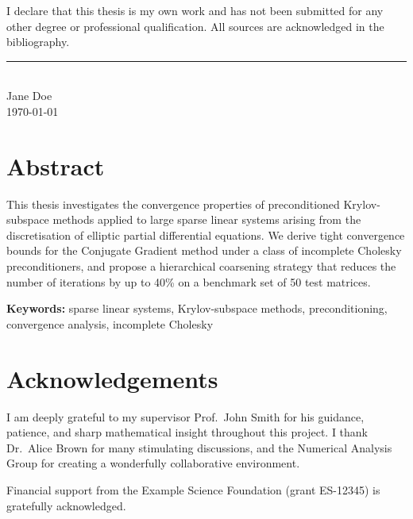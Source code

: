 \documentclass[
    12pt,
    a4paper,
    twoside,           %
    openright          %
]{book}
\begin{document}
I declare that this thesis is my own work and has not been submitted for any
other degree or professional qualification. All sources are acknowledged in
the bibliography.

\vspace{2cm}
\noindent
\rule{6cm}{0.4pt}\\
Jane Doe\\
\today

\chapter*{Abstract}

This thesis investigates the convergence properties of preconditioned
Krylov-subspace methods applied to large sparse linear systems arising from
the discretisation of elliptic partial differential equations.  We derive
tight convergence bounds for the Conjugate Gradient method under a class of
incomplete Cholesky preconditioners, and propose a hierarchical coarsening
strategy that reduces the number of iterations by up to 40\% on a benchmark
set of 50 test matrices.

\medskip
\noindent\textbf{Keywords:} sparse linear systems, Krylov-subspace methods,
preconditioning, convergence analysis, incomplete Cholesky

\chapter*{Acknowledgements}

I am deeply grateful to my supervisor Prof.\ John Smith for his guidance,
patience, and sharp mathematical insight throughout this project.  I thank
Dr.\ Alice Brown for many stimulating discussions, and the Numerical Analysis
Group for creating a wonderfully collaborative environment.

Financial support from the Example Science Foundation (grant ES-12345) is
gratefully acknowledged.

\tableofcontents
\listoffigures
\listoftables
\end{document}
